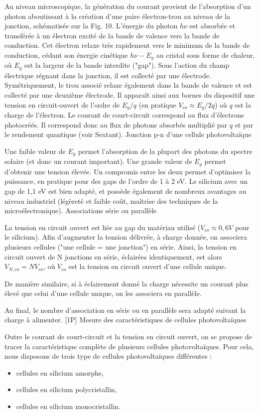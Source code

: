 \documentclass{article}%
\begin{document}
Au niveau microscopique, la génération du courant provient de l'absorption d'un photon aboutissant à la création d'une paire électron-trou au niveau de la jonction, schématisée sur la Fig. 10. L'énergie du photon $h \nu$ est absorbée et transférée à un électron excité de la bande de valence vers la bande de conduction. Cet électron relaxe très rapidement vers le minimum de la bande de conduction, cédant son énergie cinétique $h\nu-E_g$ au cristal sous forme de chaleur, où $E_g$ est la largeur de la bande interdite ("gap"). Sous l'action du champ électrique régnant dans la jonction, il est collecté par une électrode. Symétriquement, le trou associé relaxe également dans la bande de valence et est collecté par une deuxième électrode. Il apparaît ainsi aux bornes du dispositif une tension en circuit-ouvert de l'ordre de $E_g/q$ (en pratique $V_{co} \approx E_g/2q$) où $q$ est la charge de l'électron. Le courant de court-circuit correspond au flux d'électrons photocréés. Il correspond donc au flux de photons absorbés multiplié par $q$ et par le rendement quantique (voir Sextant).
Jonction p-n d'une cellule photovoltaïque

Une faible valeur de $E_g$ permet l'absorption de la plupart des photons du spectre solaire (et donc un courant important). Une grande valeur de $E_g$ permet d'obtenir une tension élevée. Un compromis entre les deux permet d'optimiser la puissance, en pratique pour des gaps de l'ordre de 1 à 2 eV. Le silicium avec un gap de 1,1 eV est bien adapté, et possède également de nombreux avantages au niveau industriel (légèreté et faible coût, maîtrise des techniques de la microélectronique).
Associations série ou parallèle

La tension en circuit ouvert est liée au gap du matériau utilisé ($V_{co}\approx 0,6V$ pour le silicium). Afin d'augmenter la tension délivrée, à charge donnée, on associera plusieurs cellules ("une cellule = une jonction") en série. Ainsi, la tension en circuit ouvert de N jonctions en série, éclairées identiquement, est alors $V_{N, co}=N V_{co}$, où $V_{co}$ est la tension en circuit ouvert d'une cellule unique.

De manière similaire, si à éclairement donné la charge nécessite un courant plus élevé que celui d'une cellule unique, on les associera en parallèle.

Au final, le nombre d'association en série ou en parallèle sera adapté suivant la charge à alimenter.
[1P] Mesure des caractéristiques de cellules photovoltaïques

Outre le courant de court-circuit et la tension en circuit ouvert, on se propose de tracer la caractéristique complète de plusieurs cellules photovoltaïques. Pour cela, nous disposons de trois type de cellules photovoltaïques différentes :
\begin{itemize}
	\item    cellules en silicium amorphe,
	\item    cellules en silicium polycristallin,
	\item    cellules en silicium monocristallin.
\end{itemize}
\end{document}
